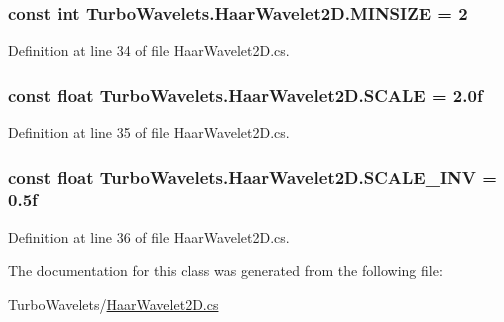 \hypertarget{class_turbo_wavelets_1_1_haar_wavelet2_d_a841ed0ce87560b5a4e5b94e4b2630765}{
\subsubsection[{\-M\-I\-N\-S\-I\-Z\-E}]{\setlength{\rightskip}{0pt plus 5cm}const int {\bf \-Turbo\-Wavelets.\-Haar\-Wavelet2\-D.\-M\-I\-N\-S\-I\-Z\-E} = 2}}\label{class_turbo_wavelets_1_1_haar_wavelet2_d_a841ed0ce87560b5a4e5b94e4b2630765}


\-Definition at line 34 of file \-Haar\-Wavelet2\-D.\-cs.

\hypertarget{class_turbo_wavelets_1_1_haar_wavelet2_d_a1c6cc94e0c41dd74fc3c8f7e36bf123f}{
\subsubsection[{\-S\-C\-A\-L\-E}]{\setlength{\rightskip}{0pt plus 5cm}const float {\bf \-Turbo\-Wavelets.\-Haar\-Wavelet2\-D.\-S\-C\-A\-L\-E} = 2.\-0f}}\label{class_turbo_wavelets_1_1_haar_wavelet2_d_a1c6cc94e0c41dd74fc3c8f7e36bf123f}


\-Definition at line 35 of file \-Haar\-Wavelet2\-D.\-cs.

\hypertarget{class_turbo_wavelets_1_1_haar_wavelet2_d_adbc2c681478c8bd315a77b6ddf57e9bd}{
\subsubsection[{\-S\-C\-A\-L\-E\-\_\-\-I\-N\-V}]{\setlength{\rightskip}{0pt plus 5cm}const float {\bf \-Turbo\-Wavelets.\-Haar\-Wavelet2\-D.\-S\-C\-A\-L\-E\-\_\-\-I\-N\-V} = 0.\-5f}}\label{class_turbo_wavelets_1_1_haar_wavelet2_d_adbc2c681478c8bd315a77b6ddf57e9bd}


\-Definition at line 36 of file \-Haar\-Wavelet2\-D.\-cs.



\-The documentation for this class was generated from the following file\-:\begin{DoxyCompactItemize}
\item 
\-Turbo\-Wavelets/\hyperlink{_haar_wavelet2_d_8cs}{\-Haar\-Wavelet2\-D.\-cs}\end{DoxyCompactItemize}
